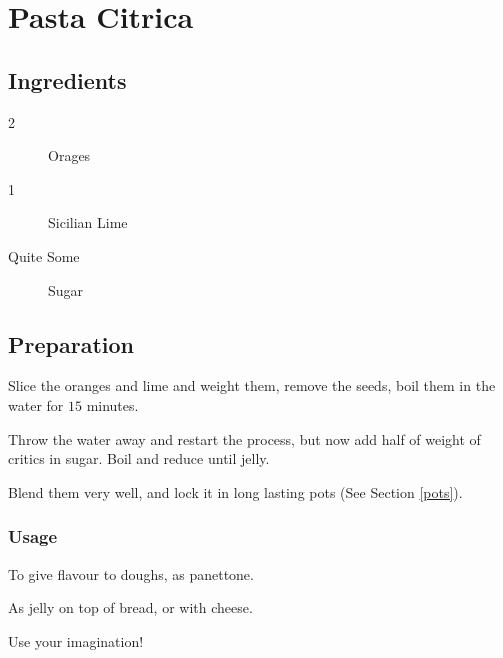 \setchapterpreamble[u]{\margintoc}
\chapter{Pasta Citrica}\label{pasta citrica}

\section{Ingredients}

\begin{multicols}{2}
	\begin{description}
		\item[2] Orages
		\item[1] Sicilian Lime
		\item[Quite Some] Sugar
	\end{description}
\end{multicols}	

\section{Preparation}
Slice the oranges and lime and weight them, remove the seeds, boil them in the water for $15$ minutes. 

Throw the water away and restart the process, but now add half of weight of critics in sugar. Boil and reduce until jelly.

Blend them very well, and lock it in long lasting pots (See Section \ref{pots}). 

\subsection{Usage}

To give flavour to doughs, as panettone.

As jelly on top of bread, or with cheese.

Use your imagination!